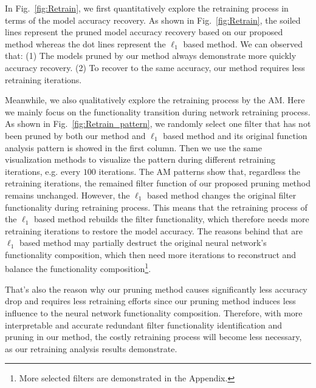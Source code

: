 \documentclass{article} %
\begin{document}
In Fig.~\ref{fig:Retrain}, we first quantitatively explore the retraining process in terms of the model accuracy recovery.
  As shown in Fig.~\ref{fig:Retrain}, the soiled lines represent the pruned model accuracy recovery based on our proposed method whereas the dot lines represent the $\ell_1$ based method.
  We can observed that:
  (1) The models pruned by our method always demonstrate more quickly accuracy recovery.
  (2) To recover to the same accuracy, our method requires less retraining iterations.

Meanwhile, we also qualitatively explore the retraining process by the AM. Here we mainly focus on the functionality transition during network retraining process.
  As shown in Fig.~\ref{fig:Retrain_pattern}, we randomly select one filter that has not been pruned by both our method and $\ell_1$ based method and its original function analysis pattern is showed in the first column.
  Then we use the same visualization methods to visualize the pattern during different retraining iterations, e.g. every $100$ iterations.
  The AM patterns show that, regardless the retraining iterations, the remained filter function of our proposed pruning method remains unchanged.
  However, the $\ell_1$ based method changes the original filter functionality during retraining process. This means that the retraining process of the $\ell_1$ based method rebuilds the filter functionality, which therefore needs more retraining iterations to restore the model accuracy. The reasons behind that are $\ell_1$ based method may partially destruct the original neural network's functionality composition, which then need more iterations to reconstruct and balance the functionality composition\footnote{More selected filters are demonstrated in the Appendix.}.

  That's also the reason why our pruning method causes significantly less accuracy drop and requires less retraining efforts since our pruning method induces less influence to the neural network functionality composition.
  Therefore, with more interpretable and accurate redundant filter functionality identification and pruning in our method, the costly retraining process will become less necessary, as our retraining analysis results demonstrate.
\end{document}
